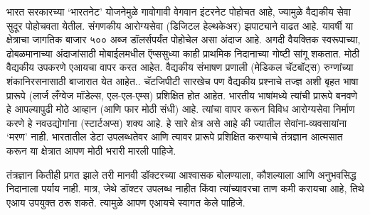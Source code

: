 भारत सरकारच्या `भारतनेट' योजनेमुळे गावोगावी वेगवान इंटरनेट पोहोचत आहे, ज्यामुळे वैद्यकीय सेवा सुदूर पोहोचवता येतील. संगणकीय आरोग्यसेवा (डिजिटल हेल्थकेअर) झपाट्याने वाढत आहे. यावर्षी या क्षेत्राचा जागतिक बाजार ५०० अब्ज डॉलर्सपर्यंत पोहोचेल असा अंदाज आहे. अगदी वैयक्तिक स्वरूपाच्या, ढोबळमानाच्या अंदाजांसाठी मोबाईलमधील ऍप्ससुध्या काही प्राथमिक निदानाच्या गोष्टी सांगू शकतात. मोठी वैद्यकीय उपकरणे एआयचा वापर करत आहेत. वैद्यकीय संभाषण प्रणाली (मेडिकल चॅटबॉट्स) रुग्णांच्या शंकानिरसनासाठी बाजारात येत आहेत.. चॅटजिपीटी सारखेच पण वैद्यकीय प्रश्नाचे तज्ज्ञ अशी बृहत भाषा प्रारूपे (लार्ज लँग्वेज मॉडेल्स, एल-एल-एम्स) प्रशिक्षित होत आहेत. भारतीय भाषांमध्ये त्यांची प्रारूपे बनवणे हे आपल्यापुढी मोठे आव्हान (आणि फार मोठी संधी) आहे. त्यांचा वापर करून विविध आरोग्यसेवा निर्माण करणे हे नवउद्योगांना (स्टार्टअप्स) शक्य आहे. हे सारे क्षेत्र असे आहे की ज्यातील सेवांना-व्यवसायांना `मरण' नाही. भारतातील डेटा उपलब्धतेवर आणि त्यावर प्रारूपे प्रशिक्षित करण्याचे तंत्रज्ञान आत्मसात करून या क्षेत्रात आपण मोठी भरारी मारली पाहिजे. 

तंत्रज्ञान कितीही प्रगत झाले तरी मानवी डॉक्टरच्या आश्वासक बोलण्याला, कौशल्याला आणि अनुभवसिद्ध निदानाला पर्याय नाही. मात्र, जेथे डॉक्टर उपलब्ध नाहीत किंवा त्यांच्यावरचा ताण कमी करायचा आहे, तिथे एआय उपयुक्त ठरू शकते. त्यामुळे आपण एआयचे स्वागत केले पाहिजे.